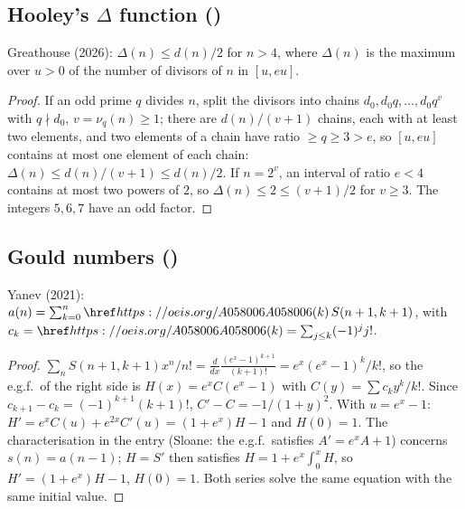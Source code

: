 \subsection{Hooley's \texorpdfstring{$\Delta$}{Delta} function ()}\label{s:A226898}
Greathouse (2026): $\Delta(n)\le d(n)/2$ for $n>4$, where $\Delta(n)$ is the maximum over $u>0$ of the number of
divisors of $n$ in $[u,eu]$.
\begin{proof} If an odd prime $q$ divides $n$, split the divisors into chains $d_0,d_0q,\dots,d_0q^v$ with
$q\nmid d_0$, $v=\nu_q(n)\ge1$; there are $d(n)/(v+1)$ chains, each with at least two elements, and two elements of
a chain have ratio $\ge q\ge3>e$, so $[u,eu]$ contains at most one element of each chain:
$\Delta(n)\le d(n)/(v+1)\le d(n)/2$. If $n=2^v$, an interval of ratio $e<4$ contains at most two powers of $2$, so
$\Delta(n)\le2\le(v+1)/2$ for $v\ge3$. The integers $5,6,7$ have an odd factor. \end{proof}

\subsection{Gould numbers ()}\label{s:A040027}
Yanev (2021): $a(n)=\sum_{k=0}^n\oeis{A058006}(k)\,S(n+1,k+1)$, with $c_k=\oeis{A058006}(k)=\sum_{j\le k}(-1)^jj!$.
\begin{proof} $\sum_nS(n+1,k+1)x^n/n!=\frac{d}{dx}\frac{(e^x-1)^{k+1}}{(k+1)!}=e^x(e^x-1)^k/k!$, so the e.g.f.\ of
the right side is $H(x)=e^xC(e^x-1)$ with $C(y)=\sum c_ky^k/k!$. Since $c_{k+1}-c_k=(-1)^{k+1}(k+1)!$,
$C'-C=-1/(1+y)^2$. With $u=e^x-1$: $H'=e^xC(u)+e^{2x}C'(u)=(1+e^x)H-1$ and $H(0)=1$. The characterisation in the
entry (Sloane: the e.g.f.\ satisfies $A'=e^xA+1$) concerns $s(n)=a(n-1)$; $H=S'$ then satisfies $H=1+e^x\int_0^xH$,
so $H'=(1+e^x)H-1$, $H(0)=1$. Both series solve the same equation with the same initial value. \end{proof}

